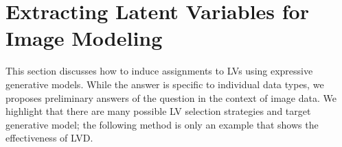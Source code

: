 \documentclass{article} %
\begin{document}

\section{Extracting Latent Variables for Image Modeling}
\label{sec:extracting-lvs}

This section discusses how to induce assignments to LVs using expressive generative models. While the answer is specific to individual data types, we proposes preliminary answers of the question in the context of image data. We highlight that there are many possible LV selection strategies and target generative model; the following method is only an example that shows the effectiveness of LVD.
\end{document}
